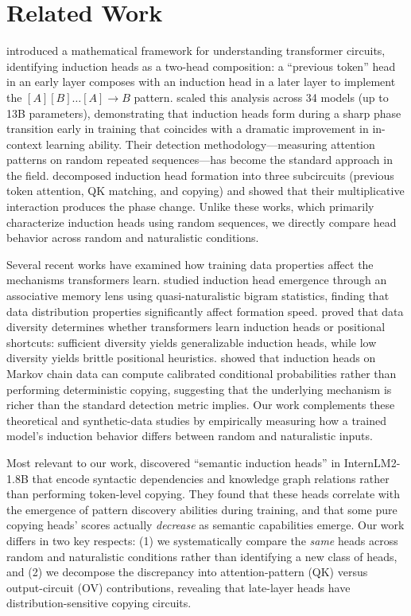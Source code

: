 \section{Related Work}
\label{sec:related}

\citet{elhage2021mathematical} introduced a mathematical framework for understanding transformer circuits, identifying induction heads as a two-head composition: a ``previous token'' head in an early layer composes with an induction head in a later layer to implement the $[A][B]\ldots[A] \rightarrow B$ pattern.
\citet{olsson2022context} scaled this analysis across 34 models (up to 13B parameters), demonstrating that induction heads form during a sharp phase transition early in training that coincides with a dramatic improvement in in-context learning ability.
Their detection methodology---measuring attention patterns on random repeated sequences---has become the standard approach in the field.
\citet{singh2024needs} decomposed induction head formation into three subcircuits (previous token attention, QK matching, and copying) and showed that their multiplicative interaction produces the phase change.
Unlike these works, which primarily characterize induction heads using random sequences, we directly compare head behavior across random and naturalistic conditions.

Several recent works have examined how training data properties affect the mechanisms transformers learn.
\citet{bietti2023birth} studied induction head emergence through an associative memory lens using quasi-naturalistic bigram statistics, finding that data distribution properties significantly affect formation speed.
\citet{kawata2025shortcut} proved that data diversity determines whether transformers learn induction heads or positional shortcuts: sufficient diversity yields generalizable induction heads, while low diversity yields brittle positional heuristics.
\citet{edelman2024evolution} showed that induction heads on Markov chain data can compute calibrated conditional probabilities rather than performing deterministic copying, suggesting that the underlying mechanism is richer than the standard detection metric implies.
Our work complements these theoretical and synthetic-data studies by empirically measuring how a trained model's induction behavior differs between random and naturalistic inputs.

Most relevant to our work, \citet{ren2024identifying} discovered ``semantic induction heads'' in InternLM2-1.8B that encode syntactic dependencies and knowledge graph relations rather than performing token-level copying.
They found that these heads correlate with the emergence of pattern discovery abilities during training, and that some pure copying heads' scores actually \emph{decrease} as semantic capabilities emerge.
Our work differs in two key respects: (1) we systematically compare the \emph{same} heads across random and naturalistic conditions rather than identifying a new class of heads, and (2) we decompose the discrepancy into attention-pattern (QK) versus output-circuit (OV) contributions, revealing that late-layer heads have distribution-sensitive copying circuits.
